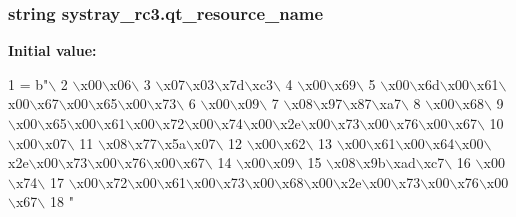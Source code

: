 \subsubsection[{qt\+\_\+resource\+\_\+name}]{\setlength{\rightskip}{0pt plus 5cm}string systray\+\_\+rc3.\+qt\+\_\+resource\+\_\+name}\label{namespacesystray__rc3_ab38afc13288b2415a28733c61690a9c1}
{\bfseries Initial value\+:}
\begin{DoxyCode}
1 = b\textcolor{stringliteral}{"\(\backslash\)}
2 \textcolor{stringliteral}{\(\backslash\)x00\(\backslash\)x06\(\backslash\)}
3 \textcolor{stringliteral}{\(\backslash\)x07\(\backslash\)x03\(\backslash\)x7d\(\backslash\)xc3\(\backslash\)}
4 \textcolor{stringliteral}{\(\backslash\)x00\(\backslash\)x69\(\backslash\)}
5 \textcolor{stringliteral}{\(\backslash\)x00\(\backslash\)x6d\(\backslash\)x00\(\backslash\)x61\(\backslash\)x00\(\backslash\)x67\(\backslash\)x00\(\backslash\)x65\(\backslash\)x00\(\backslash\)x73\(\backslash\)}
6 \textcolor{stringliteral}{\(\backslash\)x00\(\backslash\)x09\(\backslash\)}
7 \textcolor{stringliteral}{\(\backslash\)x08\(\backslash\)x97\(\backslash\)x87\(\backslash\)xa7\(\backslash\)}
8 \textcolor{stringliteral}{\(\backslash\)x00\(\backslash\)x68\(\backslash\)}
9 \textcolor{stringliteral}{\(\backslash\)x00\(\backslash\)x65\(\backslash\)x00\(\backslash\)x61\(\backslash\)x00\(\backslash\)x72\(\backslash\)x00\(\backslash\)x74\(\backslash\)x00\(\backslash\)x2e\(\backslash\)x00\(\backslash\)x73\(\backslash\)x00\(\backslash\)x76\(\backslash\)x00\(\backslash\)x67\(\backslash\)}
10 \textcolor{stringliteral}{\(\backslash\)x00\(\backslash\)x07\(\backslash\)}
11 \textcolor{stringliteral}{\(\backslash\)x08\(\backslash\)x77\(\backslash\)x5a\(\backslash\)x07\(\backslash\)}
12 \textcolor{stringliteral}{\(\backslash\)x00\(\backslash\)x62\(\backslash\)}
13 \textcolor{stringliteral}{\(\backslash\)x00\(\backslash\)x61\(\backslash\)x00\(\backslash\)x64\(\backslash\)x00\(\backslash\)x2e\(\backslash\)x00\(\backslash\)x73\(\backslash\)x00\(\backslash\)x76\(\backslash\)x00\(\backslash\)x67\(\backslash\)}
14 \textcolor{stringliteral}{\(\backslash\)x00\(\backslash\)x09\(\backslash\)}
15 \textcolor{stringliteral}{\(\backslash\)x08\(\backslash\)x9b\(\backslash\)xad\(\backslash\)xc7\(\backslash\)}
16 \textcolor{stringliteral}{\(\backslash\)x00\(\backslash\)x74\(\backslash\)}
17 \textcolor{stringliteral}{\(\backslash\)x00\(\backslash\)x72\(\backslash\)x00\(\backslash\)x61\(\backslash\)x00\(\backslash\)x73\(\backslash\)x00\(\backslash\)x68\(\backslash\)x00\(\backslash\)x2e\(\backslash\)x00\(\backslash\)x73\(\backslash\)x00\(\backslash\)x76\(\backslash\)x00\(\backslash\)x67\(\backslash\)}
18 \textcolor{stringliteral}{"}
\end{DoxyCode}
\hypertarget{namespacesystray__rc3_af7a4be8d5557b5cb03a5933c6c074fd0}{}
